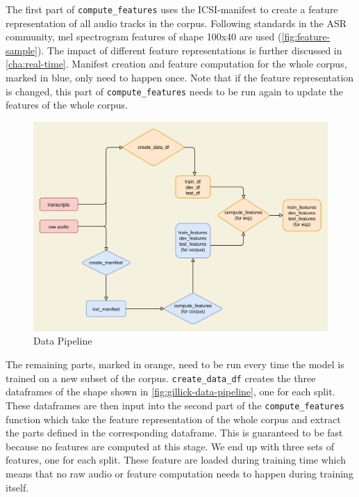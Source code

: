 \documentclass[bsc,frontabs,parskip,deptreport]{infthesis}
\begin{document}
The first part of \verb|compute_features| uses the ICSI-manifest to create a feature representation of all audio tracks in the corpus. Following standards in the ASR community, mel spectrogram features of shape 100x40 are used (\autoref{fig:feature-sample}). The impact of different feature representations is further discussed in \autoref{cha:real-time}. 
Manifest creation and feature computation for the whole corpus, marked in blue, only need to happen once.
Note that if the feature representation is changed, this part of \verb|compute_features| needs to be run again to update the features of the whole corpus.


\begin{figure}[h!]
    \centering
    \includegraphics[width=15cm]{imgs/diagrams/Pipeline.drawio.png}
    \caption{Data Pipeline}
    \label{fig:data-pipeline}
\end{figure}

The remaining parts, marked in orange, need to be run every time the model is trained on a new subset of the corpus.
\verb|create_data_df| creates the three dataframes of the shape shown in \autoref{fig:gillick-data-pipeline}, one for each split.
These dataframes are then input into the second part of the \verb|compute_features| function which take the feature representation of the whole corpus and extract the parts defined in the corresponding dataframe. This is guaranteed to be fast because no features are computed at this stage.
We end up with three sets of features, one for each split. 
These feature are loaded during training time which means that no raw audio or feature computation needs to happen during training itself.
\end{document}
